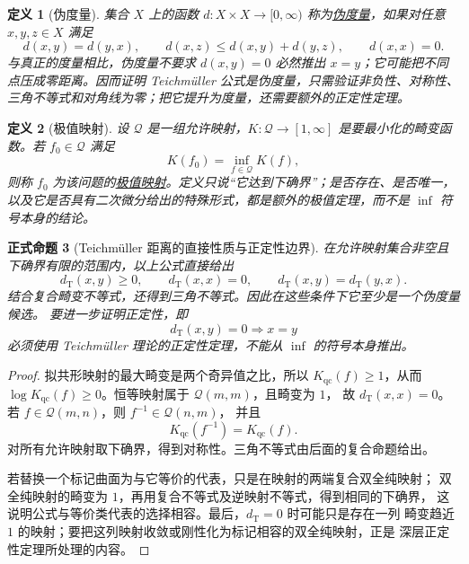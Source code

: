 \documentclass[UTF8,fontset=none,a4paper,11pt]{ctexart}
\theoremstyle{foundation-definition}
\newtheorem{definition}{定义}[section]
\theoremstyle{foundation-theorem}
\theoremstyle{foundation-proposition}
\newtheorem{proposition}[definition]{正式命题}
\theoremstyle{foundation-example}
\theoremstyle{foundation-remark}
\theoremstyle{foundation-theorem}
\newcommand{\term}[2]{\hyperref[#1]{#2}}
\begin{document}
\begin{definition}[伪度量]\label{def:pseudometric}
集合 \(X\) 上的函数 \(d:X\times X\to[0,\infty)\) 称为\term{def:pseudometric}{伪度量}，如果对任意 \(x,y,z\in X\) 满足
\[
d(x,y)=d(y,x),\qquad d(x,z)\leq d(x,y)+d(y,z),
\qquad d(x,x)=0.
\]
与真正的度量相比，伪度量不要求 \(d(x,y)=0\) 必然推出 \(x=y\)；它可能把不同点压成零距离。因而证明 Teichmüller 公式是伪度量，只需验证非负性、对称性、三角不等式和对角线为零；把它提升为度量，还需要额外的正定性定理。
\end{definition}

\begin{definition}[极值映射]\label{def:extremal-map}
设 \(\mathcal Q\) 是一组允许映射，\(K:\mathcal Q\to[1,\infty]\) 是要最小化的畸变函数。若 \(f_0\in\mathcal Q\) 满足
\[
K(f_0)=\inf_{f\in\mathcal Q}K(f),
\]
则称 \(f_0\) 为该问题的\term{def:extremal-map}{极值映射}。定义只说“它达到下确界”；是否存在、是否唯一，以及它是否具有二次微分给出的特殊形式，都是额外的极值定理，而不是 \(\inf\) 符号本身的结论。
\end{definition}

\begin{proposition}[Teichmüller 距离的直接性质与正定性边界]\label{prop:teich-distance-basic}
在允许映射集合非空且下确界有限的范围内，以上公式直接给出
\[
d_{\mathrm T}(x,y)\geq0,\qquad
d_{\mathrm T}(x,x)=0,\qquad
d_{\mathrm T}(x,y)=d_{\mathrm T}(y,x).
\]
结合复合畸变不等式，还得到三角不等式。因此在这些条件下它至少是一个伪度量候选。
要进一步证明正定性，即
\[
d_{\mathrm T}(x,y)=0\Longrightarrow x=y
\]
必须使用 Teichmüller 理论的正定性定理，不能从 \(\inf\) 的符号本身推出。
\end{proposition}

\begin{proof}
拟共形映射的最大畸变是两个奇异值之比，所以 \(K_{\mathrm{qc}}(f)\geq1\)，从而
\(\log K_{\mathrm{qc}}(f)\geq0\)。恒等映射属于 \(\mathcal Q(m,m)\)，且畸变为 \(1\)，
故 \(d_{\mathrm T}(x,x)=0\)。若 \(f\in\mathcal Q(m,n)\)，则 \(f^{-1}\in\mathcal Q(n,m)\)，
并且
\[
K_{\mathrm{qc}}(f^{-1})=K_{\mathrm{qc}}(f).
\]
对所有允许映射取下确界，得到对称性。三角不等式由后面的复合命题给出。

若替换一个标记曲面为与它等价的代表，只是在映射的两端复合双全纯映射；
双全纯映射的畸变为 \(1\)，再用复合不等式及逆映射不等式，得到相同的下确界，
这说明公式与等价类代表的选择相容。最后，\(d_{\mathrm T}=0\) 时可能只是存在一列
畸变趋近 \(1\) 的映射；要把这列映射收敛或刚性化为标记相容的双全纯映射，正是
深层正定性定理所处理的内容。
\end{proof}
\end{document}

